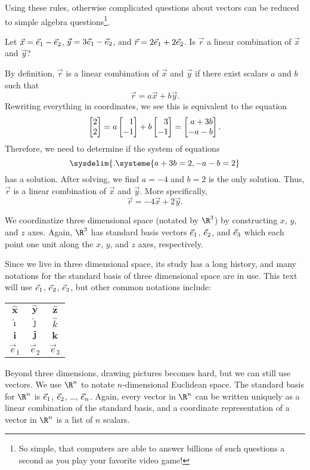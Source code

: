 Using these rules, otherwise complicated questions about vectors can be reduced
to simple algebra questions\footnote{ So simple, that computers are able to answer billions of
such questions a second as you play your favorite video game!}.

\begin{example}
	Let $\vec x={\vec e_1}-{\vec e_2}$, $\vec y=3{\vec e_1}-{\vec e_2}$, and $\vec r=2{\vec e_1}+2{\vec e_2}$. Is
	$\vec r$ a linear combination of $\vec x$ and $\vec y$?

	By definition, $\vec r$ is a linear combination of $\vec x$ and $\vec y$ if there exist scalars $a$ and $b$ such that
	\[
	    \vec r= a\vec x+b\vec y.
	\]
	Rewriting everything in coordinates, we see this is equivalent to the equation
	\[
		\mat{2\\2}=a\mat{1\\-1}+b\mat{3\\-1} = \mat{a+3b\\-a-b}.
	\]
	Therefore, we need to determine if the system of equations
	\[
	    \sysdelim\{.
		\systeme{
			a+3b=2,    
			-a-b=2     
		}
	\]
	has a solution.
	After solving, we find
	$a=-4$ and $b=2$ is the only solution. Thus, $\vec r$ is a linear combination of $\vec x$ and $\vec y$. More specifically, 
	\[
	    \vec r = -4\vec x+2\vec y.
	\]
\end{example}

We coordinatize three dimensional space (notated by $\R^3$) by constructing $x$, $y$, and $z$ axes.
Again, $\R^3$ has standard basis vectors ${\vec e_1}$, ${\vec e_2}$, and ${\vec e_3}$ which each
point one unit along the $x$, $y$, and $z$ axes, respectively.

Since we live in three dimensional space, its study has a long history, and many notations
for the standard basis of three dimensional space are in use. This text will use ${\vec e_1}$, ${\vec e_2}$, ${\vec e_3}$, but other common
notations include:
\begin{center}
	\begin{tabular}{c  c  c}
		$\hat{\mathbf{x}}$ & $\hat{\mathbf{y}}$ &$\hat{\mathbf{z}}$\\
		$\hat{\imath}$ & $\hat{\jmath}$ &$\hat{k}$\\
		$\mathbf{i}$ & $\mathbf j$ & $\mathbf k$\\
		$\vec e_1$ & $\vec e_2$ & $\vec e_3$
	\end{tabular}
\end{center}

Beyond three dimensions, drawing pictures becomes hard, but we can still use vectors.
We use $\R^n$ to notate $n$-dimensional Euclidean space. The standard basis for $\R^n$ is
$\vec { e}_{1}$, $\vec { e}_{2}$, \ldots, $\vec { e}_{n}$. Again, every vector in $\R^n$ can be written
uniquely as a linear combination of the standard basis, and a coordinate representation
of a vector in $\R^n$ is a list of $n$ scalars.

